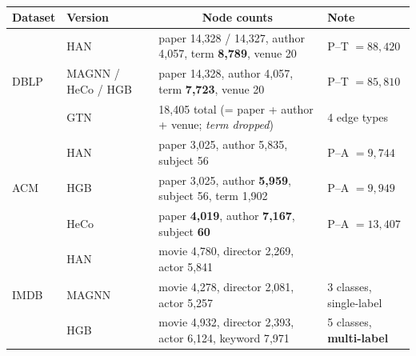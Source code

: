 \begin{table}[htbp]
\centering
\small
\caption{}
\label{p2:tab:versions}
\begin{tabular}{llrrrrl}
\toprule
Dataset & Version & \multicolumn{4}{c}{Node counts} & Note \\
\midrule
\multirow{3}{*}{DBLP}
 & HAN   & \multicolumn{4}{l}{paper 14{,}328 / 14{,}327, author 4{,}057, term \textbf{8{,}789}, venue 20}
         & P--T $=88{,}420$ \\
 & MAGNN / HeCo / HGB & \multicolumn{4}{l}{paper 14{,}328, author 4{,}057, term \textbf{7{,}723}, venue 20}
         & P--T $=85{,}810$ \\
 & GTN   & \multicolumn{4}{l}{18{,}405 total (= paper + author + venue; \emph{term dropped})} & 4 edge types \\
\midrule
\multirow{3}{*}{ACM}
 & HAN   & \multicolumn{4}{l}{paper 3{,}025, author 5{,}835, subject 56} & P--A $=9{,}744$ \\
 & HGB   & \multicolumn{4}{l}{paper 3{,}025, author \textbf{5{,}959}, subject 56, term 1{,}902} & P--A $=9{,}949$ \\
 & HeCo  & \multicolumn{4}{l}{paper \textbf{4{,}019}, author \textbf{7{,}167}, subject \textbf{60}} & P--A $=13{,}407$ \\
\midrule
\multirow{3}{*}{IMDB}
 & HAN   & \multicolumn{4}{l}{movie 4{,}780, director 2{,}269, actor 5{,}841} & \\
 & MAGNN & \multicolumn{4}{l}{movie 4{,}278, director 2{,}081, actor 5{,}257} & 3 classes, single-label \\
 & HGB   & \multicolumn{4}{l}{movie 4{,}932, director 2{,}393, actor 6{,}124, keyword 7{,}971}
         & 5 classes, \textbf{multi-label} \\
\bottomrule
\end{tabular}
\end{table}

